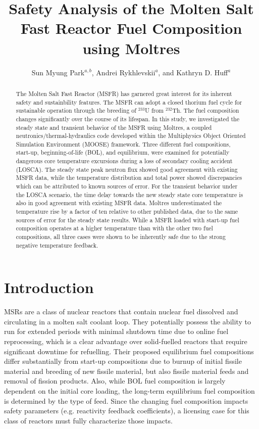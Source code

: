 \documentclass{anstrans}
\title{Safety Analysis of the Molten Salt Fast Reactor Fuel Composition using
Moltres}
\author{Sun Myung Park$^{a,b}$, Andrei Rykhlevskii$^a$, and
Kathryn D. Huff$^a$}
\institute{$^a$Dept. of Nuclear, Plasma and Radiological Engineering,
University of Illinois at Urbana-Champaign \\
$^b$smpark3@illinois.edu}
\begin{document}
\begin{abstract}
%
    The Molten
    Salt Fast Reactor (MSFR) has garnered great interest for its inherent
    safety and sustainbility features. The MSFR can adopt a closed thorium fuel
    cycle for
    sustainable operation through the breeding of $^{233}$U from $^{232}$Th.
    The fuel composition changes significantly over the course of its lifespan.
    In this study, we investigated the steady state and transient behavior of
    the MSFR using Moltres, a coupled neutronics/thermal-hydraulics code
    developed within the Multiphysics Object Oriented Simulation Environment
    (MOOSE) framework. Three different fuel compositions, start-up,
    beginning-of-life (BOL), and equilibrium, were examined for potentially
    dangerous
    core temperature excursions during a loss of secondary cooling accident
    (LOSCA). The steady state peak neutron flux showed good agreement
    with existing MSFR data, while the temperature distribution and total power
    showed discrepancies which can be attributed to known sources of error.
    For the transient behavior under the LOSCA
    scenario, the time delay towards the new steady state core temperature is
    also in good agreement with existing MSFR data. Moltres underestimated the
    temperature rise by a factor of ten relative to other published data, due
    to the same sources of
    error for the steady state results. While a MSFR loaded with
    start-up fuel composition operates at a higher temperature than with the
    other two fuel compositions, all three cases were shown to be inherently
    safe due to the strong negative temperature feedback.
\end{abstract}

\section{Introduction}

	\glspl{MSR} are a class of nuclear reactors that
	contain nuclear fuel dissolved and circulating in a molten salt coolant
	loop.
	They potentially possess the ability to run for extended 
    periods with minimal shutdown time due to online fuel reprocessing, which
    is a clear advantage over solid-fuelled reactors that require significant
    downtime for refuelling.
    Their proposed equilibrium fuel compositions differ substantially from
    start-up compositions due to burnup of initial fissile material and 
    breeding of new fissile material, but also fissile material feeds and 
    removal of fission products. Also, while \gls{BOL} fuel composition is
    largely dependent on the initial core loading, the long-term equilibrium
    fuel composition is determined by the type of feed.
    Since the changing fuel composition 
    impacts safety parameters (e.g. reactivity feedback coefficients), a 
    licensing case for this class of reactors  must fully characterize 
    those impacts.
\end{document}
